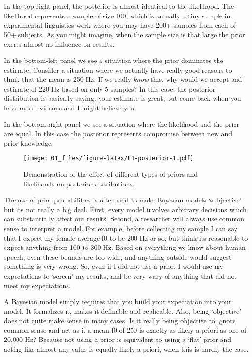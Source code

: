 \documentclass[
]{book}
\begin{document}
In the top-right panel, the posterior is almost identical to the likelihood. The likelihood represents a sample of size 100, which is actually a tiny sample in experimental linguistics work where you may have 200+ samples from each of 50+ subjects. As you might imagine, when the sample size is that large the prior exerts almost no influence on results.

In the bottom-left panel we see a situation where the prior dominates the estimate. Consider a situation where we actually have really good reasons to think that the mean is 250 Hz. If we really \emph{know} this, why would we accept and estimate of 220 Hz based on only 5 samples? In this case, the posterior distribution is basically saying: your estimate is great, but come back when you have more evidence and I might believe you.

In the bottom-right panel we see a situation where the likelihood and the prior are equal. In this case the posterior represents compromise between new and prior knowledge.

\begin{figure}
\centering
\texttt{[image: 01\_files/figure-latex/F1-posterior-1.pdf]}
\caption{\label{fig:F1-posterior}Demonstration of the effect of different types of priors and likelihoods on posterior distributions.}
\end{figure}

The use of prior probabilities is often said to make Bayesian models `subjective' but its not really a big deal. First, every model involves arbitrary decisions which can substantially affect our results. Second, a researcher will always use common sense to interpret a model. For example, before collecting my sample I can say that I expect my female average f0 to be 200 Hz or so, but think its reasonable to expect anything from 100 to 300 Hz. Based on everything we know about human speech, even these bounds are too wide, and anything outside would suggest something is very wrong. So, even if I did not use a prior, I would use my expectations to `screen' my results, and be very wary of anything that did not meet my expectations.

A Bayesian model simply requires that you build your expectation into your model. It formalizes it, makes it definable and replicable. Also, being `objective' does not quite make sense in many cases. Is it really being objective to ignore common sense and act as if a mean f0 of 250 is exactly as likely a priori as one of 20,000 Hz? Because not using a prior is equivalent to using a `flat' prior and acting like almost any value is equally likely a priori, when this is hardly the case.
\end{document}

